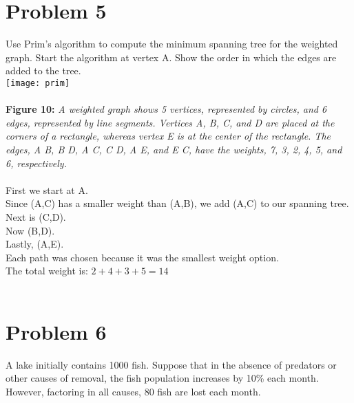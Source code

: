 \documentclass{amsart}
\theoremstyle{definition}
\theoremstyle{Exercise}
\theoremstyle{remark}
\theoremstyle{rule}
\numberwithin{equation}{section}
\begin{document}
  \section*{Problem 5}
  Use Prim’s algorithm to compute the minimum spanning tree for the weighted graph. Start the algorithm at vertex A. Show the order in which the edges are added to the tree.
\\
\texttt{[image: prim]}
\\\\
{\color{blue} {\bf Figure 10:} \emph{A weighted graph shows 5 vertices, represented by circles, and 6 edges, represented by line segments. Vertices A, B, C, and D are placed at the corners of a rectangle, whereas vertex E is at the center of the rectangle. The edges, A B, B D, A C, C D, A E, and E C, have the weights, 7, 3, 2, 4, 5, and 6, respectively.
  }
}
\\\\
  First we start at A.\\
  Since (A,C) has a smaller weight than (A,B), we add (A,C) to our spanning tree.\\
  Next is (C,D).\\
  Now (B,D).\\
  Lastly, (A,E).\\
  Each path was chosen because it was the smallest weight option.\\
  The total weight is: $2 + 4 + 3 + 5 = 14$
\\\\
 \newpage
  \section*{Problem 6}
A lake initially contains 1000 fish. Suppose that in the absence of predators or other causes of removal, the fish population increases by 10\% each month. However, factoring in all causes, 80 fish are lost each month.\\
\end{document}
